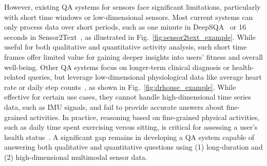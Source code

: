 However, existing QA systems for sensors face significant limitations, particularly with short time windows or low-dimensional sensors.
Most current systems can only process data over short periods, such as one minute in DeepSQA~\cite{xing2021deepsqa} or 16 seconds in Sensor2Text~\cite{chen2024sensor2text}, as illustrated in Fig.~\ref{fig:sensor2text_example}. While useful for both qualitative and quantitative activity analysis, such short time frames offer limited value for gaining deeper insights into users’ fitness and overall well-being.
Other QA systems focus on longer-term clinical diagnosis or health-related queries, but leverage low-dimensional physiological data like average heart rate or daily step counts~\cite{englhardt2024classification,kim2024health,yang2024drhouse}, as shown in Fig.~\ref{fig:drhouse_example}. While effective for certain use cases, they cannot handle high-dimensional time series data, such as IMU signals, and fail to provide accurate answers about fine-grained activities.
In practice, reasoning based on fine-grained physical activities, such as daily time spent exercising versus sitting, is critical for assessing a user’s health status~\cite{us2021increase}. A significant gap remains in developing a QA system capable of answering both qualitative and quantitative questions using (1) long-duration and (2) high-dimensional multimodal sensor data.




